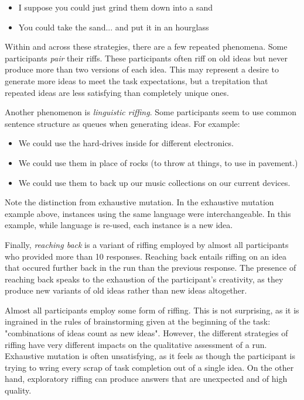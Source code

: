 \begin{itemize}
    \item I suppose you could just grind them down into a sand
    \item You could take the sand... and put it in an hourglass
\end{itemize}

Within and across these strategies, there are a few repeated phenomena.
Some participants \emph{pair} their riffs. These participants  often riff on old ideas but never produce more than two versions of each idea. This may represent a desire to generate more ideas to meet the task expectations, but a trepitation that repeated ideas are less satisfying than completely unique ones.

Another phenomenon is \emph{linguistic riffing}. Some participants seem to use common sentence structure as queues when generating ideas. For example:

\begin{itemize}
    \item We could use the hard-drives inside for different electronics.
    \item We could use them in place of rocks (to throw at things, to use in pavement.)
    \item We could use them to back up our music collections on our current devices.
\end{itemize}

Note the distinction from exhaustive mutation. In the exhaustive mutation example above, instances using the same language were interchangeable.
In this example, while language is re-used, each instance is a new idea.

Finally, \emph{reaching back} is a variant of riffing employed by almost all participants who provided more than 10 responses. Reaching back entails riffing on an idea that occured further back in the run than the previous response. The presence of reaching back speaks to the exhaustion of the participant's creativity, as they produce new variants of old ideas rather than new ideas altogether.

Almost all participants employ some form of riffing. This is not surprising, as it is ingrained in the rules of brainstorming given at the beginning of the task: "combinations of ideas count as new ideas". However, the different strategies of riffing have very different impacts on the qualitative assessment of a run. Exhaustive mutation is often unsatisfying, as it feels as though the participant is trying to wring every scrap of task completion out of a single idea. On the other hand, exploratory riffing can produce answers that are unexpected and of high quality. 


